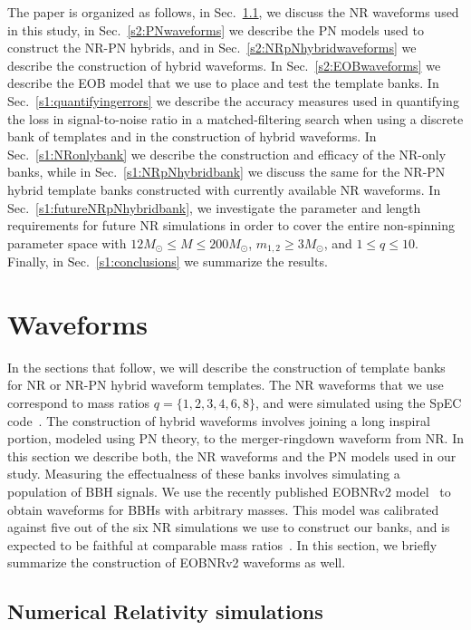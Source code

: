 \documentclass[aps,
prd,
twocolumn,
superscriptaddress,
lengthcheck,showpacs,letterpaper,nofootinbib,
floatfix]{revtex4-1}
\begin{document}
The paper is organized as follows, in Sec.~\ref{s2:NRwaveforms}, we discuss
the NR waveforms used in this study, in Sec.~\ref{s2:PNwaveforms} we
describe the PN models used to construct the NR-PN hybrids,  and in Sec.~\ref{s2:NRpNhybridwaveforms} we describe the
construction of hybrid waveforms. In Sec.~\ref{s2:EOBwaveforms} we 
describe the EOB model that we use to place and test the template
banks. In Sec.~\ref{s1:quantifyingerrors} we describe the accuracy
measures used in quantifying the loss in signal-to-noise ratio in a
matched-filtering search when using a discrete bank of templates and
in the construction of hybrid waveforms. In Sec.~\ref{s1:NRonlybank}
we describe the construction and efficacy of the NR-only banks, while in
Sec.~\ref{s1:NRpNhybridbank} we discuss the same for the NR-PN hybrid 
template banks constructed with currently available NR waveforms. In
Sec.~\ref{s1:futureNRpNhybridbank}, we investigate the parameter and length
requirements for future NR simulations in order to cover the entire 
non-spinning parameter space with $12 M_\odot\leq M\leq 200M_\odot$, 
$m_{1,2} \geq 3M_\odot$, and $1 \leq q \leq 10$. Finally, in 
Sec.~\ref{s1:conclusions} we summarize the results. 

\section{Waveforms}\label{s1:waveforms}

In the sections that follow, we will describe the construction of template 
banks for NR or NR-PN hybrid waveform templates. The NR waveforms that we
use correspond to mass ratios $q=\{1,2,3,4,6,8\}$, and were simulated using
the SpEC code~\cite{spec}. The construction of hybrid
waveforms involves joining a long inspiral portion, modeled using PN theory,
to the merger-ringdown waveform from NR. In this section we describe both, the 
NR waveforms and the PN models used in our study. Measuring the effectualness
of these banks involves simulating a population of BBH signals. We use the 
recently published EOBNRv2 model~\cite{BuonannoEOBv2Main} to obtain waveforms
for BBHs with arbitrary masses. This model was calibrated against five out of 
the six NR simulations we use to construct our banks, and is expected to be 
faithful at comparable mass ratios~\cite{BuonannoEOBv2Main}. In this section, 
we briefly summarize the construction of EOBNRv2 waveforms as well.

\subsection{Numerical Relativity simulations}\label{s2:NRwaveforms}
\end{document}
